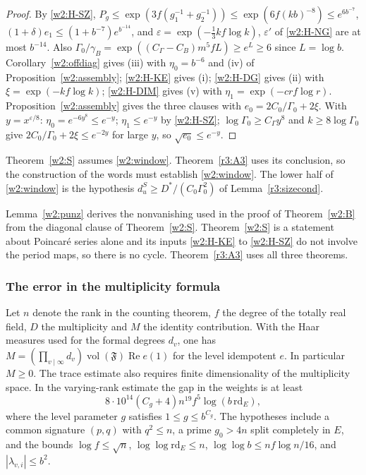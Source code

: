 \begin{proof}
By \ref{w2:H-SZ}, $P_g\le\exp(3f(g_1^{-1}+g_2^{-1}))\le\exp(6f(kb)^{-8})\le e^{6b^{-7}}$, $(1+\delta)e_1\le(1+b^{-7})e^{b^{-14}}$, and $\varepsilon=\exp(-\tfrac13kf\log k)$, $\varepsilon'$ of \ref{w2:H-NG} are at most $b^{-14}$. Also $\Gamma_0/\gamma_B=\exp((C_\Gamma-C_B)m^5fL)\ge e^{L}\ge6$ since $L=\log b$. Corollary~\ref{w2:offdiag} gives (iii) with $\eta_0=b^{-6}$ and (iv) of Proposition~\ref{w2:assembly}; \ref{w2:H-KE} gives (i); \ref{w2:H-DG} gives (ii) with $\xi=\exp(-kf\log k)$; \ref{w2:H-DIM} gives (v) with $\eta_1=\exp(-crf\log r)$. Proposition~\ref{w2:assembly} gives the three clauses with $e_0=2C_0/\Gamma_0+2\xi$. With $y=x^{\varepsilon/8}$: $\eta_0=e^{-6y^8}\le e^{-y}$; $\eta_1\le e^{-y}$ by \ref{w2:H-SZ}; $\log\Gamma_0\ge C_\Gamma y^8$ and $k\ge8\log\Gamma_0$ give $2C_0/\Gamma_0+2\xi\le e^{-2y}$ for large $y$, so $\sqrt{e_0}\le e^{-y}$.
\end{proof}

\begin{remark}\label{w2:rem:window}
Theorem~\ref{w2:S} assumes \eqref{w2:window}. Theorem~\ref{r3:A3} uses its conclusion, so the construction of the words must establish \eqref{w2:window}. The lower half of \eqref{w2:window} is the hypothesis $d^S_u\ge D^*/(C_0\Gamma_0^2)$ of Lemma~\ref{r3:sizecond}.
\end{remark}

\begin{remark}[no circularity]\label{w2:rem:circ}
Lemma~\ref{w2:punz} derives the nonvanishing used in the proof of Theorem~\ref{w2:B} from the diagonal clause of Theorem~\ref{w2:S}. Theorem~\ref{w2:S} is a statement about Poincar\'e series alone and its inputs \ref{w2:H-KE} to \ref{w2:H-SZ} do not involve the period maps, so there is no cycle. Theorem~\ref{r3:A3} uses all three theorems.
\end{remark}

\subsubsection{The error in the multiplicity formula}\label{count:error}

Let $n$ denote the rank in the counting theorem, $f$ the degree of the
totally real field, $D$ the multiplicity and $M$ the identity contribution.
With the Haar measures used for the formal degrees $d_v$, one has
$M=(\prod_{v\mid\infty}d_v)\operatorname{vol}(\mathfrak F)
\operatorname{Re}e(1)$ for the level idempotent $e$. In particular $M\ge0$.
The trace estimate also requires finite dimensionality of the multiplicity
space. In the varying-rank estimate the gap in the weights is at least
\[
  8\cdot10^{14}(C_g+4)n^{19}f^5\log(b\,\mathrm{rd}_E),
\]
where the level parameter $g$ satisfies $1\le g\le b^{C_g}$.
The hypotheses include a common signature $(p,q)$ with $q^2\le n$,
a prime $g_0>4n$ split completely in $E$, and the bounds
$\log f\le\sqrt n$, $\log\log\mathrm{rd}_E\le n$,
$\log\log b\le nf\log n/16$, and $|\lambda_{v,i}|\le b^2$.



